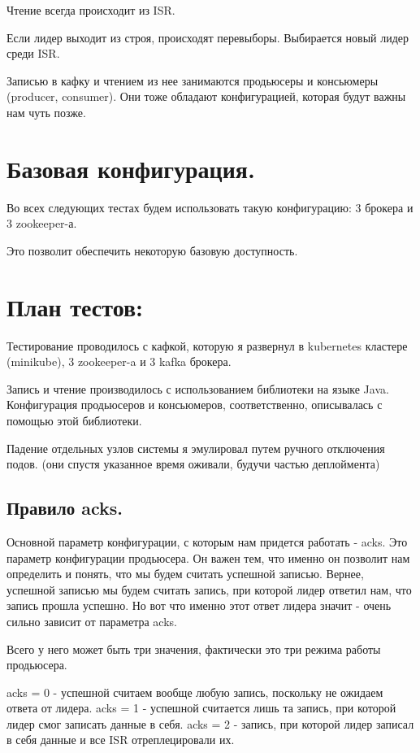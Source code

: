 \documentclass[11pt]{article}
\begin{document}
    Чтение всегда происходит из ISR.

    Если лидер выходит из строя, происходят перевыборы. Выбирается новый лидер среди ISR.

    Записью в кафку и чтением из нее занимаются продьюсеры и консьюмеры (producer, consumer). Они тоже обладают
    конфигурацией, которая будут важны нам чуть позже.


    \section{Базовая конфигурация.}
    Во всех следующих тестах будем использовать такую конфигурацию: 3 брокера и 3 zookeeper-а.

    Это позволит обеспечить некоторую базовую доступность.
    \section{План тестов:}
    Тестирование проводилось с кафкой, которую я развернул в kubernetes кластере (minikube), 3 zookeeper-a и 3 kafka брокера.

    Запись и чтение производилось с использованием библиотеки на языке Java. Конфигурация продьюсеров и консьюмеров,
    соответственно, описывалась с помощью этой библиотеки.

    Падение отдельных узлов системы я эмулировал путем ручного отключения подов. (они спустя указанное время оживали, будучи частью деплоймента)

    \subsection{Правило acks.}
    Основной параметр конфигурации, с которым нам придется работать - acks. Это параметр конфигурации продьюсера. Он
    важен тем, что именно он позволит нам определить и понять, что мы будем считать успешной записью. Вернее,
    успешной записью мы будем считать запись, при которой лидер ответил нам, что запись прошла успешно. Но вот что
    именно этот ответ лидера значит - очень сильно зависит от параметра acks.

    Всего у него может быть три значения, фактически это три режима работы продьюсера.

    acks = 0 - успешной считаем вообще любую запись, поскольку не ожидаем ответа от лидера.
    acks = 1 - успешной считается лишь та запись, при которой лидер смог записать данные в себя.
    acks = 2 - запись, при которой лидер записал в себя данные и все ISR отреплецировали их.
\end{document}
